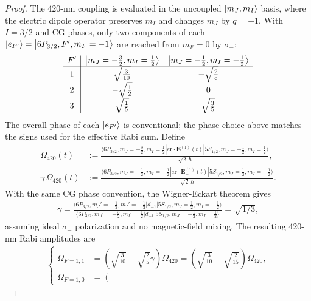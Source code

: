 \begin{proof}
    The 420-nm coupling is evaluated in the uncoupled $\ket{m_J,m_I}$ basis, where the electric dipole operator preserves $m_I$ and changes $m_J$ by $q=-1$. With $I=3/2$ and CG phases,
    only two components of each $\ket{e_{F'}}=\ket{6P_{3/2},F',m_F=-1}$ are reached from $m_F=0$ by $\sigma_-$:
    \begin{align}
    \begin{array}{c|cc}
    F'&
    \ket{m_J=-\tfrac32,m_I=\tfrac12}&
    \ket{m_J=-\tfrac12,m_I=-\tfrac12}\\
    \hline
    1&\sqrt{\frac{3}{10}}&-\sqrt{\frac{2}{5}}\\
    2&-\sqrt{\frac{1}{2}}&0\\
    3&\sqrt{\frac{1}{5}}&\sqrt{\frac{3}{5}}
    \end{array}
    \end{align}
    The overall phase of each $\ket{e_{F'}}$ is conventional; the phase choice above matches the signs used for the effective Rabi sum.
    Define
    \begin{align}
    \Omega_{420}(t)
    &:=
    \frac{
    \langle 6P_{3/2},m_J=-\tfrac32,m_I=\tfrac12|
    e\mathbf r\cdot\mathbf E^{(1)}_-(t)
    |5S_{1/2},m_J=-\tfrac12,m_I=\tfrac12\rangle
    }{\sqrt2\,\hbar},\\
    \gamma\,\Omega_{420}(t)
    &:=
    \frac{
    \langle 6P_{3/2},m_J=-\tfrac12,m_I=-\tfrac12|
    e\mathbf r\cdot\mathbf E^{(1)}_-(t)
    |5S_{1/2},m_J=\tfrac12,m_I=-\tfrac12\rangle
    }{\sqrt2\,\hbar}.
    \end{align}
    With the same CG phase convention, the Wigner-Eckart theorem gives
    \begin{align}
    \gamma
    =
    \frac{
    \langle 6P_{3/2},m_J'=-\tfrac12,m_I'=-\tfrac12|d_{-1}|5S_{1/2},m_J=\tfrac12,m_I=-\tfrac12\rangle
    }{
    \langle 6P_{3/2},m_J'=-\tfrac32,m_I'=\tfrac12|d_{-1}|5S_{1/2},m_J=-\tfrac12,m_I=\tfrac12\rangle
    }
    =\sqrt{{1}/{3}},
    \end{align}
    assuming ideal $\sigma_-$ polarization and no magnetic-field mixing.
    The resulting 420-nm Rabi amplitudes are
    \begin{align}
        \left\{
    \begin{aligned}
    \Omega_{F=1,1}
    &=\left(
    \sqrt{\frac{3}{10}}
    -\sqrt{\frac{2}{5}}\gamma\right)\Omega_{420}
    =  \left(
        \sqrt{\frac{3}{10}}
        -\sqrt{\frac{2}{15}}
        \right)\Omega_{420},\\
    \Omega_{F=1,0}&=\left(

\end{aligned}
\end{align}
\end{proof}
